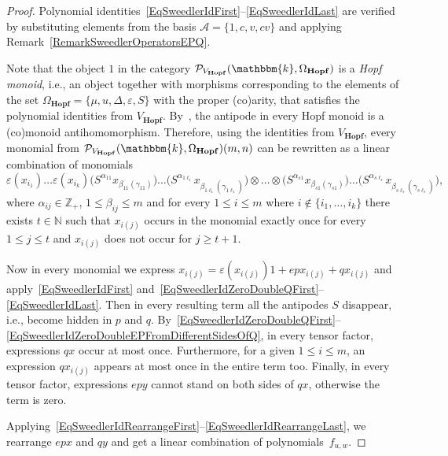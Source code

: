 \documentclass[12pt, reqno, a4paper]{amsart}
\theoremstyle{plain}
\theoremstyle{remark}
\theoremstyle{definition}
\numberwithin{equation}{section}
\begin{document}
\begin{proof} Polynomial identities~\eqref{EqSweedlerIdFirst}--\eqref{EqSweedlerIdLast}
	are verified by substituting elements from the basis $\mathcal A = \lbrace 1, c, v, cv\rbrace$ and applying Remark~\ref{RemarkSweedlerOperatorsEPQ}.
	
	Note that the object $1$ in the category $\mathcal P_{V_\mathbf{Hopf}}(\mathbbm{k}, \Omega_\mathbf{Hopf})$ is a \textit{Hopf monoid}, i.e.,
	an object together with morphisms corresponding to the elements of the set $\Omega_\mathbf{Hopf}=\lbrace \mu, u, \Delta, \varepsilon, S \rbrace$ with the proper (co)arity,
	that satisfies the polynomial identities from $V_\mathbf{Hopf}$.
	By~\cite[Proposition~36]{Porst1}, the antipode in every Hopf monoid is a (co)monoid antihomomorphism.	
	Therefore, using the identities from $V_\mathbf{Hopf}$,
	every monomial from $\mathcal P_{V_\mathbf{Hopf}}(\mathbbm{k}, \Omega_\mathbf{Hopf})(m,n)$
	can be rewritten as a linear combination of monomials
	$$\varepsilon(x_{i_1})\ldots \varepsilon(x_{i_k}) \bigl(S^{\alpha_{11}}x_{\beta_{11}(\gamma_{11})}\bigr)
	\dots \bigl(S^{\alpha_{1\ell_1}}x_{\beta_{1\ell_1}(\gamma_{1\ell_1})}\bigr) \otimes \dots  \otimes
	\bigl(S^{\alpha_{s1}}x_{\beta_{s1}(\gamma_{s1})}\bigr)
	\dots \bigl(S^{\alpha_{s\ell_s}}x_{\beta_{s\ell_s}(\gamma_{s\ell_s})}\bigr),
	$$ where $\alpha_{ij} \in \mathbb Z_+$, $1\leqslant \beta_{ij} \leqslant m$
	and for every $1\leqslant i \leqslant m$ where $i \notin \lbrace i_1,  \ldots, i_k \rbrace$
	there exists $t\in \mathbb N$ such that $x_{i(j)}$ occurs in the monomial exactly once for every $1\leqslant j \leqslant t$
	and $x_{i(j)}$ does not occur for $j \geqslant t+1$.
	
	Now in every monomial we express $x_{i(j)} = \varepsilon(x_{i(j)}) 1 + epx_{i(j)} + qx_{i(j)}$ and
	apply~\eqref{EqSweedlerIdFirst} and~\eqref{EqSweedlerIdZeroDoubleQFirst}--\eqref{EqSweedlerIdLast}.
	Then in every resulting term all the antipodes $S$ disappear, i.e., become hidden in $p$ and $q$.
	By~\eqref{EqSweedlerIdZeroDoubleQFirst}--\eqref{EqSweedlerIdZeroDoubleEPFromDifferentSidesOfQ},
	in every tensor factor, expressions $qx$ occur at most once. Furthermore, for a given $1\leqslant i \leqslant m$,
	an expression $qx_{i(j)}$ appears at most once in the entire term too. Finally, in every tensor factor,
	expressions $epy$ cannot stand on both sides of $qx$, otherwise the term is zero.
	
	Applying~\eqref{EqSweedlerIdRearrangeFirst}--\eqref{EqSweedlerIdRearrangeLast}, we rearrange $epx$ and $qy$
	and get a linear combination of polynomials~$f_{u,w}$.
	 

\end{proof}
\end{document}
